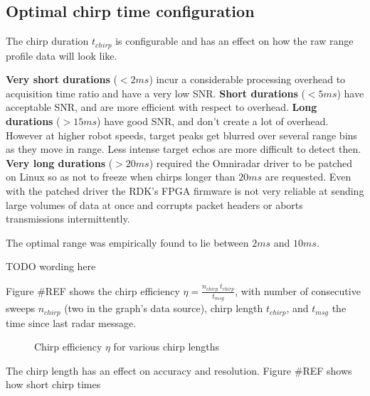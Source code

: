 \subsection{Optimal chirp time
configuration}\label{optimal-chirp-time-configuration}

The chirp duration \(t_{chirp}\) is configurable and has an effect on
how the raw range profile data will look like.

\textbf{Very short durations} (\(<2ms\)) incur a considerable processing
overhead to acquisition time ratio and have a very low SNR.
\textbf{Short durations} (\(<5ms\)) have acceptable SNR, and are more
efficient with respect to overhead. \textbf{Long durations} (\(>15ms\))
have good SNR, and don't create a lot of overhead. However at higher
robot speeds, target peaks get blurred over several range bins as they
move in range. Less intense target echos are more difficult to detect
then. \textbf{Very long durations} (\(>20ms\)) required the Omniradar
driver to be patched on Linux so as not to freeze when chirps longer
than \(20ms\) are requested. Even with the patched driver the RDK's FPGA
firmware is not very reliable at sending large volumes of data at once
and corrupts packet headers or aborts transmissions intermittently.

The optimal range was empirically found to lie between \(2ms\) and
\(10ms\).

TODO wording here

Figure \#REF shows the chirp efficiency
\(\eta = \frac{n_{chirp}~t_{chirp}}{t_{msg}}\), with number of
consecutive sweeps \(n_{chirp}\) (two in the graph's data source), chirp
length \(t_{chirp}\), and \(t_{msg}\) the time since last radar message.

\begin{figure}[htbp]
    \centering
    \label{fig:fig_chirp_eff}
    \def\svgwidth{10cm}
    
    \caption{Chirp efficiency \(\eta\) for various chirp lengths}
\end{figure}

The chirp length has an effect on accuracy and resolution. Figure \#REF
shows how short chirp times

